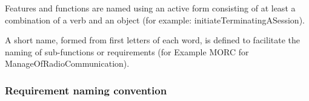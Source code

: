 Features and  functions are named using an active form consisting of at least a combination of a verb and an object (for example:   initiateTerminatingASession).

A short name, formed from first letters of each word, is defined to  facilitate the naming of sub-functions or requirements (for Example MORC for ManageOfRadioCommunication). 

\subsubsection{Requirement naming convention}

